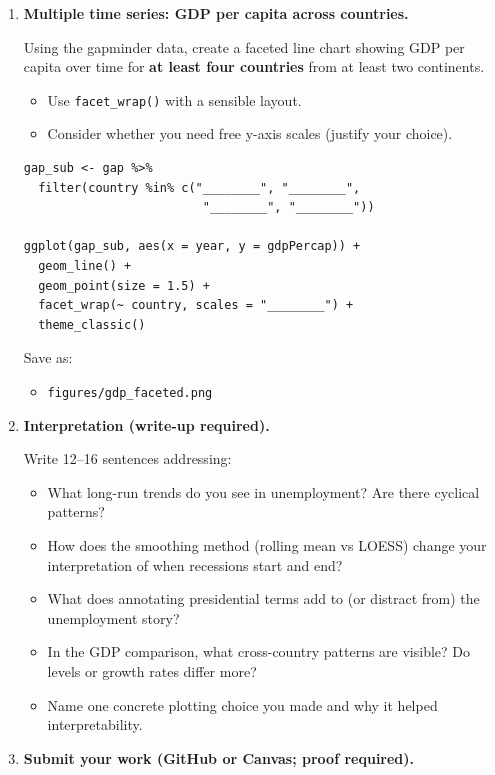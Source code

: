 \documentclass[11pt]{article}
\begin{document}
\begin{enumerate}
Save as:
\texttt{figures/unemployment\_presidents.png}

\item \textbf{Multiple time series: GDP per capita across countries.}

Using the gapminder data, create a faceted line chart showing GDP per capita over time for \textbf{at least four countries} from at least two continents.

\begin{itemize}
  \item Use \texttt{facet\_wrap()} with a sensible layout.
  \item Consider whether you need free y-axis scales (justify your choice).
\end{itemize}

\begin{verbatim}
gap_sub <- gap %>%
  filter(country %in% c("________", "________",
                         "________", "________"))

ggplot(gap_sub, aes(x = year, y = gdpPercap)) +
  geom_line() +
  geom_point(size = 1.5) +
  facet_wrap(~ country, scales = "________") +
  theme_classic()
\end{verbatim}

Save as:
\begin{itemize}
  \item \texttt{figures/gdp\_faceted.png}
\end{itemize}

\item \textbf{Interpretation (write-up required).}

Write 12--16 sentences addressing:
\begin{itemize}
  \item What long-run trends do you see in unemployment? Are there cyclical patterns?
  \item How does the smoothing method (rolling mean vs LOESS) change your interpretation of when recessions start and end?
  \item What does annotating presidential terms add to (or distract from) the unemployment story?
  \item In the GDP comparison, what cross-country patterns are visible? Do levels or growth rates differ more?
  \item Name one concrete plotting choice you made and why it helped interpretability.
\end{itemize}

\item \textbf{Submit your work (GitHub or Canvas; proof required).}


\end{enumerate}
\end{document}
